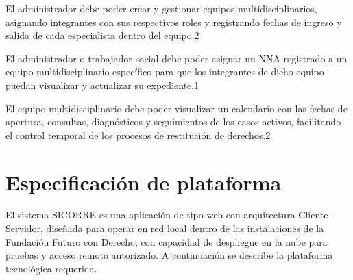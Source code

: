 \begin{requerimientosU}
	{El administrador debe poder crear y gestionar equipos 
		multidisciplinarios, asignando integrantes con sus respectivos roles 
		y registrando fechas de ingreso y salida de cada especialista 
		dentro del equipo.}{2}{\DONE}
	
	{El administrador o trabajador social debe poder asignar un NNA 
		registrado a un equipo multidisciplinario específico para que los 
		integrantes de dicho equipo puedan visualizar y actualizar su 
		expediente.}{1}{\DONE}
	
	{El equipo multidisciplinario debe poder visualizar un calendario 
		con las fechas de apertura, consultas, diagnósticos y seguimientos 
		de los casos activos, facilitando el control temporal de los 
		procesos de restitución de derechos.}{2}{\DONE}
	
\end{requerimientosU}

\section{Especificación de plataforma}

El sistema SICORRE es una aplicación de tipo web con arquitectura Cliente-Servidor, 
diseñada para operar en red local dentro de las instalaciones de la Fundación Futuro 
con Derecho, con capacidad de despliegue en la nube para pruebas y acceso remoto 
autorizado. A continuación se describe la plataforma tecnológica requerida.

